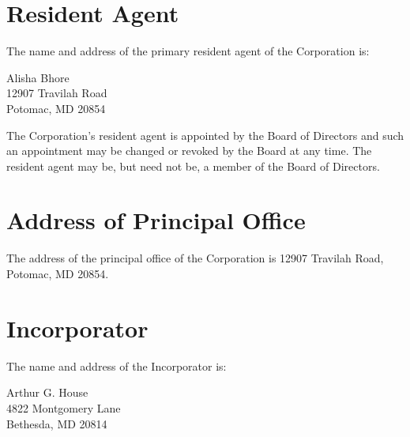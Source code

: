\documentclass{article}
\begin{document}
\section{Resident Agent}
The name and address of the primary resident agent of the Corporation is:
\newline\newline
\parbox{\textwidth}{\centering Alisha Bhore\\ 12907 Travilah Road\\ Potomac, MD 20854}
\newline\newline
The Corporation’s resident agent is appointed by the Board of Directors and such an appointment may be changed or revoked by the Board at any time.  The resident agent may be, but need not be, a member of the Board of Directors.

\section{Address of Principal Office}
The address of the principal office of the Corporation is 12907 Travilah Road, Potomac, MD 20854.

\section{Incorporator}
The name and address of the Incorporator is:
\newline\newline
\parbox{\textwidth}{\centering Arthur G. House\\ 4822 Montgomery Lane\\ Bethesda, MD 20814}
\vfill
\end{document}
